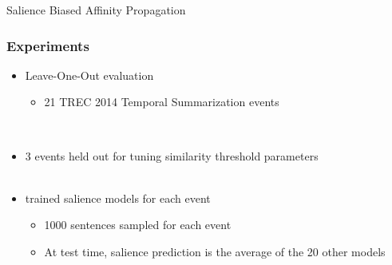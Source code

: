 \begin{frame}{Salience Biased Affinity Propagation}



\end{frame}

\begin{frame}
    \frametitle{Experiments}
    
    \begin{itemize}
    \item Leave-One-Out evaluation
        \begin{itemize}
            \item 21 TREC 2014 Temporal Summarization events
        \end{itemize}
        ~\\
        \item 3 events held out for tuning similarity threshold parameters
            ~\\
            ~\\
        \item trained salience models for each event
        \begin{itemize}
            \item 1000 sentences sampled for each event
            \item At test time, salience prediction is the average of the 
                20 other models
        \end{itemize}
    \end{itemize}
    
\end{frame}


